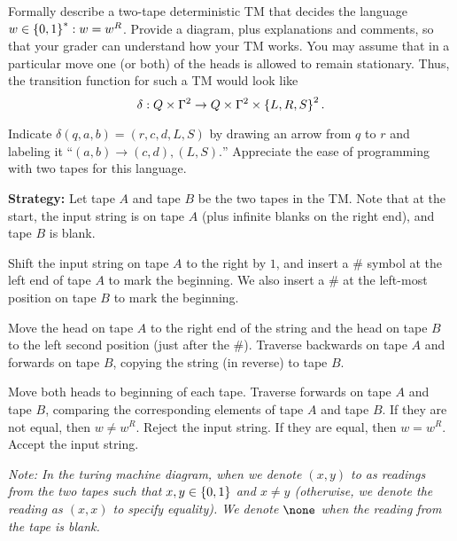 \begin{problem}
  Formally describe a two-tape deterministic TM that decides the language
  ${w \in \left\{0,1\right\}^* : w = w^R}$.
  Provide a diagram, plus explanations and comments,
  so that your grader can understand how your TM works.
  You may assume that in a particular move one (or both)
  of the heads is allowed to remain stationary.
  Thus, the transition function for such a TM would look like
  \[ \delta : Q \times \Gamma^2 \to Q \times \Gamma^2 \times \left\{L, R, S\right\}^2. \]

  \step
  Indicate $\delta(q, a , b) = (r, c, d, L, S)$ by drawing an arrow from
  $q$ to $r$ and labeling it
  ``$(a, b) \to (c, d), (L, S).$''
  Appreciate the ease of programming with two tapes for this language.
\end{problem}
\begin{Answer}
  \textbf{Strategy:}
  Let tape $A$ and tape $B$ be the two tapes in the TM.
  Note that at the start, the input string is on tape $A$
  (plus infinite blanks on the right end), and tape $B$ is blank.

  \begin{enumroman}
    \item Shift the input string on tape $A$ to the right by $1$, and insert
      a $\#$ symbol at the left end of tape $A$ to mark the beginning.
      We also insert a $\#$ at the left-most position on tape $B$ to mark the beginning.

    \item Move the head on tape $A$ to the right end of the string
      and the head on tape $B$ to the left second position (just after the $\#$).
      Traverse backwards on tape $A$ and forwards on tape $B$,
      copying the string (in reverse) to tape $B$.
    \item Move both heads to beginning of each tape.
      Traverse forwards on tape $A$ and tape $B$,
      comparing the corresponding elements of tape $A$ and tape $B$.
      If they are not equal, then $w \neq w^R$. Reject the input string.
      If they are equal, then $w = w^R$. Accept the input string.
  \end{enumroman}

  \step
  \emph{
    Note: In the turing machine diagram,
    when we denote $(x, y)$ to as readings from the two tapes
    such that $x, y \in \left\{0, 1\right\}$ and $x \neq y$
    (otherwise, we denote the reading as $(x, x)$ to specify equality).
    We denote $\none$ when the reading from the tape is blank.
    }
    

\end{Answer}
